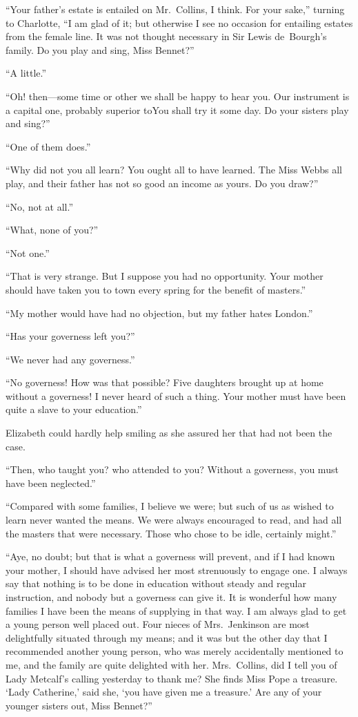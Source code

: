 ``Your father's estate is entailed on Mr.\ Collins, I think.  For
your sake,'' turning to Charlotte, ``I am glad of it; but otherwise I
see no occasion for entailing estates from the female line.  It was
not thought necessary in Sir Lewis de~Bourgh's family.  Do you
play and sing, Miss Bennet?''

``A little.''

``Oh! then---some time or other we shall be happy to hear you.
Our instrument is a capital one, probably superior to\gdash{}You
shall try it some day.  Do your sisters play and sing?''

``One of them does.''

``Why did not you all learn?  You ought all to have learned.  The
Miss Webbs all play, and their father has not so good an income
as yours.  Do you draw?''

``No, not at all.''

``What, none of you?''

``Not one.''

``That is very strange.  But I suppose you had no opportunity.
Your mother should have taken you to town every spring for the
benefit of masters.''

``My mother would have had no objection, but my father hates
London.''

``Has your governess left you?''

``We never had any governess.''

``No governess!  How was that possible?  Five daughters brought
up at home without a governess!  I never heard of such a thing.
Your mother must have been quite a slave to your education.''

Elizabeth could hardly help smiling as she assured her that had
not been the case.

``Then, who taught you?  who attended to you?  Without a
governess, you must have been neglected.''

``Compared with some families, I believe we were; but such of us
as wished to learn never wanted the means.  We were always
encouraged to read, and had all the masters that were necessary.
Those who chose to be idle, certainly might.''

``Aye, no doubt; but that is what a governess will prevent, and
if I had known your mother, I should have advised her most
strenuously to engage one.  I always say that nothing is to be
done in education without steady and regular instruction, and
nobody but a governess can give it.  It is wonderful how many
families I have been the means of supplying in that way.  I am
always glad to get a young person well placed out.  Four nieces
of Mrs.\ Jenkinson are most delightfully situated through my
means; and it was but the other day that I recommended another
young person, who was merely accidentally mentioned to me,
and the family are quite delighted with her.  Mrs.\ Collins, did I
tell you of Lady Metcalf's calling yesterday to thank me?  She
finds Miss Pope a treasure.  `Lady Catherine,' said she, `you
have given me a treasure.'  Are any of your younger sisters out,
Miss Bennet?''

